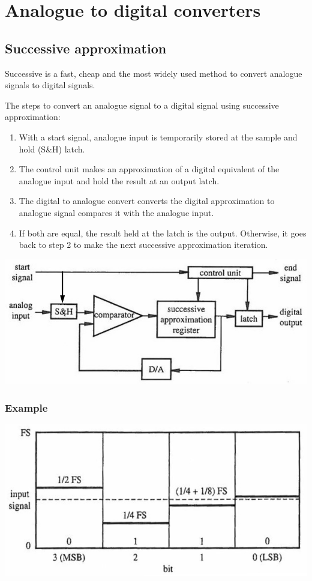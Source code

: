 \documentclass[11pt]{article}
\begin{document}
\section{Analogue to digital converters}
\label{sec:orgc25626b}

\subsection{Successive approximation}
\label{sec:orgf16d2c9}
Successive is a fast, cheap and the most widely used method to convert analogue signals to digital signals.


The steps to convert an analogue signal to a digital signal using successive approximation:
\begin{enumerate}
\item With a start signal, analogue input is temporarily stored at the sample and hold (S\&H) latch.
\item The control unit makes an approximation of a digital equivalent of the analogue input and hold the result at an output latch.
\item The digital to analogue convert converts the digital approximation to analogue signal compares it with the analogue input.
\item If both are equal, the result held at the latch is the output. Otherwise, it goes back to step 2 to make the next successive approximation iteration.
\end{enumerate}

\begin{center}
\includegraphics[width=.9\linewidth]{./images/successive-approximation.png}
\end{center}
\subsubsection{Example}
\label{sec:orgc2d40ce}
\begin{center}
\includegraphics[scale=0.7]{./images/successive-approximation-example.png}
\end{center}
\end{document}
